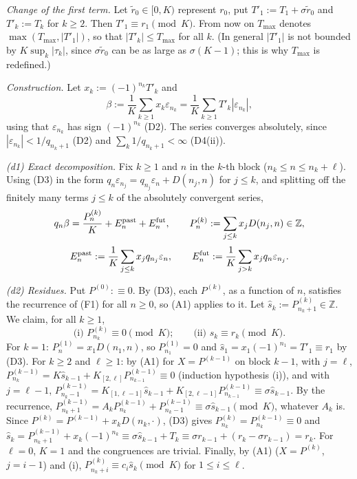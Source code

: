 \documentclass[11pt]{amsart}
\theoremstyle{definition}
\theoremstyle{remark}
\newcommand{\Z}{\mathbb{Z}}
\begin{document}
\emph{Change of the first term.} Let $\tilde r_0\in[0,K)$ represent $r_0$, put $T'_1:=T_1+\sigma\tilde r_0$ and
$T'_k:=T_k$ for $k\ge2$. Then $T'_1\equiv r_1\pmod K$. From now on $T_{\max}$ denotes
$\max(T_{\max},|T'_1|)$, so that $|T'_k|\le T_{\max}$ for all $k$. (In general $|T'_1|$ is not bounded by
$K\sup_k|\tau_k|$, since $\sigma\tilde r_0$ can be as large as $\sigma(K-1)$; this is why $T_{\max}$ is redefined.)

\emph{Construction.} Let $x_k:=(-1)^{n_k}T'_k$ and
\[
\beta:=\frac1K\sum_{k\ge1}x_k\varepsilon_{n_k}=\frac1K\sum_{k\ge1}T'_k|\varepsilon_{n_k}|,
\]
using that $\varepsilon_{n_k}$ has sign $(-1)^{n_k}$ (D2). The series converges absolutely, since
$|\varepsilon_{n_k}|<1/q_{n_k+1}$ (D2) and $\sum_k1/q_{n_k+1}<\infty$ (D4(ii)).

\emph{(d1) Exact decomposition.} Fix $k\ge1$ and $n$ in the $k$-th block ($n_k\le n\le n_k+\ell$). Using (D3) in the
form $q_n\varepsilon_{n_j}=q_{n_j}\varepsilon_n+D(n_j,n)$ for $j\le k$, and splitting off the finitely many terms
$j\le k$ of the absolutely convergent series,
\[
q_n\beta=\frac{P^{(k)}_n}K+E^{\rm past}_n+E^{\rm fut}_n,\qquad
P^{(k)}_n:=\sum_{j\le k}x_jD(n_j,n)\in\Z,
\]
\[
E^{\rm past}_n:=\frac1K\sum_{j\le k}x_jq_{n_j}\varepsilon_n,\qquad
E^{\rm fut}_n:=\frac1K\sum_{j>k}x_jq_n\varepsilon_{n_j}.
\]

\emph{(d2) Residues.} Put $P^{(0)}:\equiv0$. By (D3), each $P^{(k)}$, as a function of $n$, satisfies the recurrence of
(F1) for all $n\ge0$, so (A1) applies to it. Let $\hat s_k:=P^{(k)}_{n_k+1}\in\Z$. We claim, for all $k\ge1$,
\[
\text{(i) }P^{(k)}_{n_k}\equiv0\pmod K;\qquad\text{(ii) }\hat s_k\equiv r_k\pmod K.
\]
For $k=1$: $P^{(1)}_n=x_1D(n_1,n)$, so $P^{(1)}_{n_1}=0$ and $\hat s_1=x_1(-1)^{n_1}=T'_1\equiv r_1$ by (D3).
For $k\ge2$ and $\ell\ge1$: by (A1) for $X=P^{(k-1)}$ on block $k-1$, with $j=\ell$,
$P^{(k-1)}_{n_k}=K\hat s_{k-1}+K_{[2,\ell]}P^{(k-1)}_{n_{k-1}}\equiv0$ (induction hypothesis (i)), and with $j=\ell-1$,
$P^{(k-1)}_{n_k-1}=K_{[1,\ell-1]}\hat s_{k-1}+K_{[2,\ell-1]}P^{(k-1)}_{n_{k-1}}\equiv\sigma\hat s_{k-1}$. By the
recurrence, $P^{(k-1)}_{n_k+1}=A_kP^{(k-1)}_{n_k}+P^{(k-1)}_{n_k-1}\equiv\sigma\hat s_{k-1}\pmod K$, whatever $A_k$ is.
Since $P^{(k)}=P^{(k-1)}+x_kD(n_k,\cdot)$, (D3) gives $P^{(k)}_{n_k}=P^{(k-1)}_{n_k}\equiv0$ and
$\hat s_k=P^{(k-1)}_{n_k+1}+x_k(-1)^{n_k}\equiv\sigma\hat s_{k-1}+T_k\equiv\sigma r_{k-1}+(r_k-\sigma r_{k-1})=r_k$.
For $\ell=0$, $K=1$ and the congruences are trivial. Finally, by (A1) ($X=P^{(k)}$, $j=i-1$) and (i),
$P^{(k)}_{n_k+i}\equiv c_i\hat s_k\pmod K$ for $1\le i\le\ell$.
\end{document}
